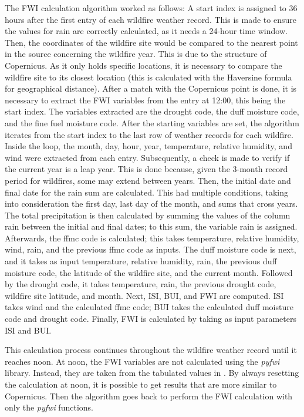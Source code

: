 The FWI calculation algorithm worked as follows: A start index is assigned to 36 hours after the first entry of each wildfire weather record. This is made to ensure the values for rain are correctly calculated, as it needs a 24-hour time window. Then, the coordinates of the wildfire site would be compared to the nearest point in the source \cite{CopernicusCDS2019} concerning the wildfire year. This is due to the structure of Copernicus. As it only holds specific locations, it is necessary to compare the wildfire site to its closest location (this is calculated with the Haversine formula for geographical distance). After a match with the Copernicus point is done, it is necessary to extract the FWI variables from the entry at 12:00, this being the start index. The variables extracted are the drought code, the duff moisture code, and the fine fuel moisture code. After the starting variables are set, the algorithm iterates from the start index to the last row of weather records for each wildfire. Inside the loop, the month, day, hour, year, temperature, relative humidity, and wind were extracted from each entry. Subsequently, a check is made to verify if the current year is a leap year. This is done because, given the 3-month record period for wildfires, some may extend between years. Then, the initial date and final date for the rain sum are calculated. This had multiple conditions, taking into consideration the first day, last day of the month, and sums that cross years. The total precipitation is then calculated by summing the values of the column rain between the initial and final dates; to this sum, the variable rain is assigned. Afterwards, the ffmc code is calculated; this takes temperature, relative humidity, wind, rain, and the previous ffmc code as inputs. The duff moisture code is next, and it takes as input temperature, relative humidity, rain, the previous duff moisture code, the latitude of the wildfire site, and the current month. Followed by the drought code, it takes temperature, rain, the previous drought code, wildfire site latitude, and month. Next, ISI, BUI, and FWI are computed. ISI takes wind and the calculated ffmc code; BUI takes the calculated duff moisture code and drought code. Finally, FWI is calculated by taking as input parameters ISI and BUI. 

This calculation process continues throughout the wildfire weather record until it reaches noon. At noon, the FWI variables are not calculated using the \textit{pyfwi} library. Instead, they are taken from the tabulated values in \cite{CopernicusCDS2019}. By always resetting the calculation at noon, it is possible to get results that are more similar to Copernicus. Then the algorithm goes back to perform the FWI calculation with only the \textit{pyfwi} functions.


